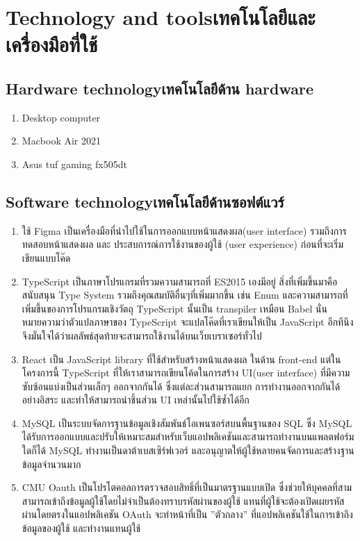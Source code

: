 \section{\ifenglish Technology and tools\else เทคโนโลยีและเครื่องมือที่ใช้\fi}

\subsection{\ifenglish Hardware technology\else เทคโนโลยีด้าน hardware\fi}
\begin{enumerate}
    \item Desktop computer
    \item Macbook Air 2021
    \item Asus tuf gaming fx505dt
\end{enumerate}


\subsection{\ifenglish Software technology\else เทคโนโลยีด้านซอฟต์แวร์\fi}
\begin{enumerate}
    \item ใช้ Figma\cite{Figma} เป็นเครื่องมือที่นำไปใช้ในการออกแบบหน้าแสดงผล(user interface) รวมถึงการทดสอบหน้าแสดงผล และ ประสบการณ์การใช้งานของผู้ใช้ (user experience) ก่อนที่จะเริ่มเขียนแบบโค๊ด
    \item TypeScript\cite{TypeScript} เป็นภาษาโปรแกรมที่รวมความสามารถที่ ES2015 เองมีอยู่ สิ่งที่เพิ่มขึ้นมาคือสนับสนุน Type System รวมถึงคุณสมบัติอื่นๆที่เพิ่มมากขึ้น เช่น Enum และความสามารถที่เพิ่มขึ้นของการโปรแกรมเชิงวัตถุ TypeScript นั้นเป็น transpiler เหมือน Babel นั่นหมายความว่าตัวแปลภาษาของ TypeScript จะแปลโค๊ดที่เราเขียนให้เป็น JavaScript อีกทีนึง จึงมั่นใจได้ว่าผลลัพธ์สุดท้ายจะสามารถใช้งานได้บนเว็บเบราเซอร์ทั่วไป
    \item React\cite{ReactJS} เป็น JavaScript library ที่ใช้สําหรับสร้างหน้าแสดงผล ในด้าน front-end แต่ในโครงการนี้ TypeScript ที่ให้เราสามารถเขียนโค้ดในการสร้าง UI(user interface) ที่มีความซับซ้อนแบ่งเป็นส่วนเล็กๆ ออกจากกันได้ ซึ่งแต่ละส่วนสามารถแยก การทํางานออกจากกันได้อย่างอิสระ และทําให้สามารถนําชิ้นส่วน UI เหล่านั้นไปใช้ซํ้าได้อีก
    \item MySQL \cite{MySQL} เป็นระบบจัดการฐานข้อมูลเชิงสัมพันธ์โอเพนซอร์สบนพื้นฐานของ SQL ซึ่ง MySQL ได้รับการออกแบบและปรับให้เหมาะสมสำหรับเว็บแอปพลิเคชันและสามารถทำงานบนแพลตฟอร์มใดก็ได้ MySQL ทำงานเป็นดาต้าเบสเซิร์ฟเวอร์ และอนุญาตให้ผู้ใช้หลายคนจัดการและสร้างฐานข้อมูลจำนวนมาก
    \item CMU Oauth\cite{Oauth} เป็นโปรโตคอลการตรวจสอบสิทธิ์ที่เป็นมาตรฐานแบบเปิด ซึ่งช่วยให้บุคคลที่สามสามารถเข้าถึงข้อมูลผู้ใช้โดยไม่จําเป็นต้องทราบรหัสผ่านของผู้ใช้ แทนที่ผู้ใช้จะต้องเปิดเผยรหัสผ่านโดยตรงในแอปพลิเคชัน OAuth จะทําหน้าที่เป็น ”ตัวกลาง” ที่แอปพลิเคชันใช้ในการเข้าถึงข้อมูลของผู้ใช้ และทํางานแทนผู้ใช้

\end{enumerate}

